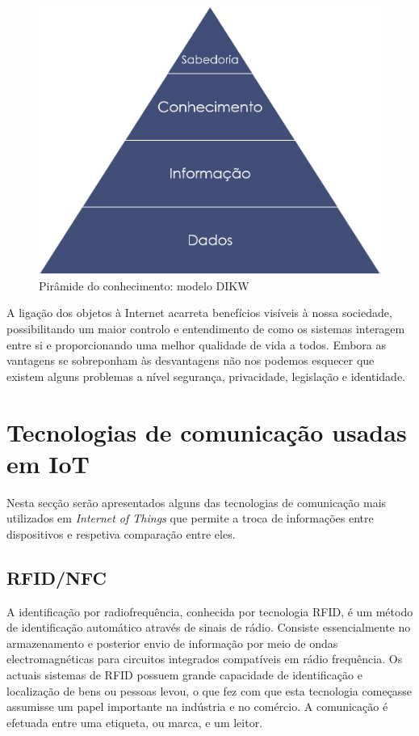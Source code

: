 \begin{figure}[!htb]
	\centering
	\includegraphics[scale=0.3]{img/cap3-iot/dikw.png}
	\caption{Pirâmide do conhecimento: modelo DIKW}
	\label{dikw}
\end{figure}



A ligação dos objetos à Internet acarreta benefícios visíveis à nossa sociedade, possibilitando um maior controlo e entendimento de como os sistemas interagem entre si e proporcionando uma melhor qualidade de vida a todos. Embora as vantagens se sobreponham às desvantagens não nos podemos esquecer que existem alguns problemas a nível segurança, privacidade, legislação e identidade.


\section{Tecnologias de comunicação usadas em \ac{IoT}}

Nesta secção serão apresentados alguns das tecnologias de comunicação mais utilizados em \textit{Internet of Things} que permite a troca de informações entre dispositivos e respetiva comparação entre eles. 
 

 
\subsection{RFID/NFC}

A identificação por radiofrequência, conhecida por tecnologia \ac{RFID}, é um método de identificação automático através de sinais de rádio. Consiste essencialmente no armazenamento e posterior envio de informação por meio de ondas electromagnéticas para circuitos integrados compatíveis em rádio frequência.  
Os actuais sistemas de \ac{RFID} possuem grande capacidade de identificação e localização de bens ou pessoas levou, o que fez com que esta tecnologia começasse assumisse um papel importante na indústria e no comércio. A comunicação é efetuada entre uma etiqueta, ou marca, e um leitor.


